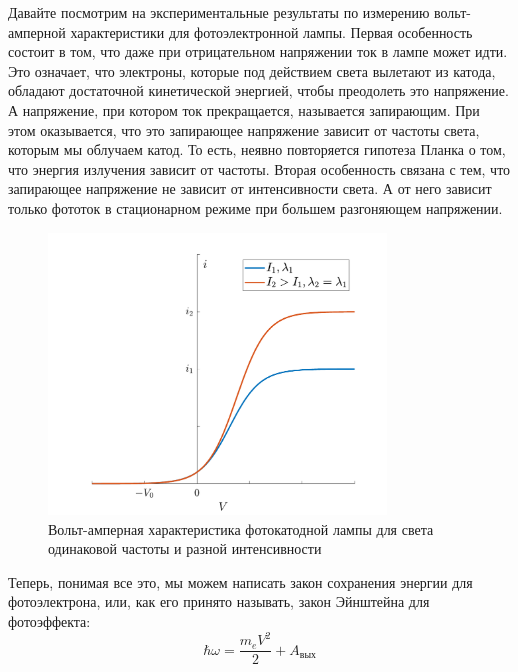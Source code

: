 \documentclass[12pt]{article}
\begin{document}
\noindent
Давайте посмотрим на экспериментальные результаты по измерению вольт-амперной характеристики для фотоэлектронной лампы. Первая особенность состоит в том, что даже при отрицательном напряжении ток в лампе может идти. Это означает, что электроны, которые под действием света вылетают из катода, обладают достаточной кинетической энергией, чтобы преодолеть это напряжение. А напряжение, при котором ток прекращается, называется запирающим. При этом оказывается, что это запирающее напряжение зависит от частоты света, которым мы облучаем катод. То есть, неявно повторяется гипотеза Планка о том, что энергия излучения зависит от частоты. Вторая особенность связана с тем, что запирающее напряжение не зависит от интенсивности света. А от него зависит только фототок в стационарном режиме при большем разгоняющем напряжении.
\begin{figure}[h]
    \centering
    \includegraphics[width=0.8\textwidth,keepaspectratio]{Seminar_02/pics/pic_01.pdf}
    \caption{Вольт-амперная характеристика фотокатодной лампы для света одинаковой частоты и разной интенсивности}
    \label{fig:sem_02_photocatod_VAX}
\end{figure}

\noindent
Теперь, понимая все это, мы можем написать закон сохранения энергии для фотоэлектрона, или, как его принято называть, закон Эйнштейна для фотоэффекта:
\begin{equation}
    \hbar \omega = \dfrac{m_eV^2}{2} + A_{\text{вых}}
\end{equation}
\end{document}
